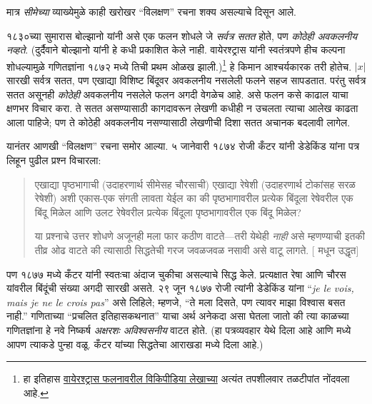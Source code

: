 \documentclass[../../../include/open-logic-section]{subfiles}
\begin{document}

मात्र \emph{सीमेच्या} व्याख्येमुळे काही खरोखर “विलक्षण” रचना शक्य असल्याचे दिसून आले.

१८३०च्या सुमारास बोल्झानो यांनी असे एक फलन शोधले जे \emph{सर्वत्र सतत} होते, पण \emph{कोठेही अवकलनीय नव्हते}. (दुर्दैवाने बोल्झानो यांनी हे कधी प्रकाशित केले नाही. वायेरश्ट्रास यांनी स्वतंत्रपणे हीच कल्पना शोधल्यामुळे गणितज्ञांना १८७२ मध्ये तिची प्रथम ओळख झाली.)\footnote{हा इतिहास \href{http://en.wikipedia.org/wiki/Weierstrass_function}{वायेरश्ट्रास फलनावरील विकिपीडिया लेखाच्या} अत्यंत तपशीलवार तळटीपांत नोंदवला आहे.} हे किमान आश्चर्यकारक तरी होतेच. $|x|$ सारखी सर्वत्र सतत, पण एखाद्या विशिष्ट बिंदूवर अवकलनीय नसलेली फलने सहज सापडतात. परंतु सर्वत्र सतत असूनही \emph{कोठेही} अवकलनीय नसलेले फलन अगदी वेगळेच आहे. असे फलन कसे काढाल याचा क्षणभर विचार करा. ते सतत असण्यासाठी कागदावरून लेखणी कधीही न उचलता त्याचा आलेख काढता आला पाहिजे; पण ते कोठेही अवकलनीय नसण्यासाठी लेखणीची दिशा सतत अचानक बदलावी लागेल.

यानंतर आणखी “विलक्षण” रचना समोर आल्या. ५ जानेवारी १८७४ रोजी कँटर यांनी डेडेकिंड यांना पत्र लिहून पुढील प्रश्न विचारला:
\begin{quote}
एखाद्या पृष्ठभागाची (उदाहरणार्थ सीमेसह चौरसाची) एखाद्या रेषेशी (उदाहरणार्थ टोकांसह सरळ रेषेशी) अशी एकास-एक संगती लावता येईल का की पृष्ठभागावरील प्रत्येक बिंदूला रेषेवरील एक बिंदू मिळेल आणि उलट रेषेवरील प्रत्येक बिंदूला पृष्ठभागावरील एक बिंदू मिळेल?

या प्रश्नाचे उत्तर शोधणे अजूनही मला फार कठीण वाटते—तरी येथेही \emph{नाही} असे म्हणण्याची इतकी तीव्र ओढ वाटते की त्यासाठी सिद्धतेची गरज जवळजवळ नसावी असे वाटू लागते.
[\citealt{Gouvea2011} मधून उद्धृत]
\end{quote}
पण १८७७ मध्ये कँटर यांनी स्वतःचा अंदाज चुकीचा असल्याचे सिद्ध केले. प्रत्यक्षात रेषा आणि चौरस यांवरील बिंदूंची संख्या अगदी सारखी असते. २९ जून १८७७ रोजी त्यांनी डेडेकिंड यांना “\emph{je le vois, mais je ne le crois pas}” असे लिहिले; म्हणजे, “ते मला दिसते, पण त्यावर माझा विश्वास बसत नाही.” गणिताच्या “प्रचलित इतिहासकथनात” याचा अर्थ अनेकदा असा घेतला जातो की त्या काळच्या गणितज्ञांना हे नवे निष्कर्ष \emph{अक्षरशः अविश्वसनीय} वाटत होते. (हा पत्रव्यवहार \citet{Gouvea2011} येथे दिला आहे आणि  मध्ये आपण त्याकडे पुन्हा वळू. कँटर यांच्या सिद्धतेचा आराखडा  मध्ये दिला आहे.)
\end{document}

